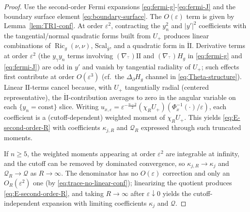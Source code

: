 \documentclass[11pt,reqno,a4paper]{amsart}
\numberwithin{equation}{section}
\theoremstyle{plain}
\newcommand{\Scal}{\mathrm{Scal}}
\theoremstyle{remark}
\theoremstyle{plain}
\begin{document}
\begin{proof}
Use the second-order Fermi expansions \eqref{eq:fermi-g}-\eqref{eq:fermi-J} and the boundary
surface element \eqref{eq:boundary-surface}. The $O(\varepsilon)$ term is given by Lemma~\ref{lem:TR1-conf}.
At order $\varepsilon^2$, contracting the $y_n^2$ and $|y'|^2$ coefficients with the tangential/normal
quadratic forms built from $U_+$ produces linear combinations of $\operatorname{Ric}_g(\nu,\nu)$, $\Scal_{\bar g}$,
and a quadratic form in $\mathring{\mathrm{II}}$. Derivative terms at order $\varepsilon^2$ (the $y_\gamma y_n$ terms involving $(\nabla_{{}^\top})\mathrm{II}$ and $(\nabla_{{}^\top})H_g$ in \eqref{eq:fermi-g} and \eqref{eq:fermi-J}) are odd in $y'$ and vanish by tangential radiality of $U_+$; such effects first contribute at order $O(\varepsilon^3)$ (cf.\ the $\Delta_\partial H_g$ channel in \eqref{eq:Theta-structure}).
Linear $\mathrm{II}$-terms cancel because, with $U_+$ tangentially radial (centered representative), the $\mathring{\mathrm{II}}$-contribution averages to zero in the angular variable on each $\{y_n=\mathrm{const}\}$ slice. Writing $u_{x,\varepsilon}=\varepsilon^{-\frac{n-2}{2}}(\chi_R U_+)\left(\Phi_x^{-1}(\cdot)/\varepsilon\right)$,
each coefficient is a (cutoff-dependent) weighted moment of $\chi_R U_+$. This yields \eqref{eq:E-second-order-R}
with coefficients $\kappa_{j,R}$ and $\mathcal Q_R$ expressed through such truncated moments.

If $n\ge5$, the weighted moments appearing at order $\varepsilon^2$ are integrable at infinity, and the cutoff can be removed by dominated convergence, so $\kappa_{j,R}\to\kappa_j$ and $\mathcal Q_R\to\mathcal Q$ as $R\to\infty$. The denominator has no $O(\varepsilon)$ correction and only an $O_R(\varepsilon^2)$ one (by
\eqref{eq:trace-no-linear-conf}); linearizing the quotient produces \eqref{eq:E-second-order-R}, and taking $R\to\infty$ after $\varepsilon\downarrow0$ yields the cutoff-independent expansion with limiting coefficients $\kappa_j$ and $\mathcal Q$.
\end{proof}
\end{document}
